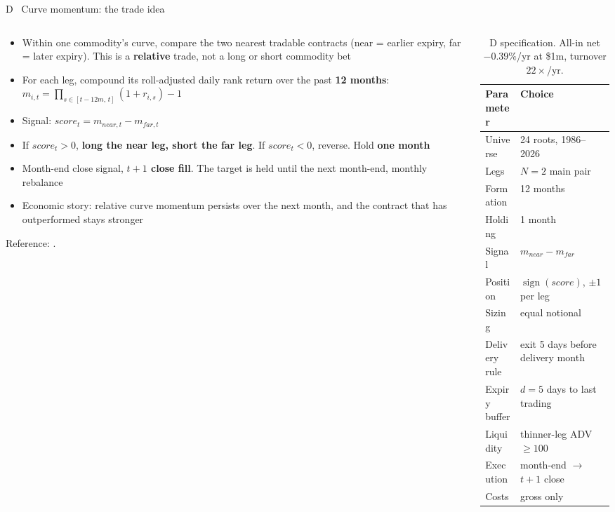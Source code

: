 \documentclass[10pt, aspectratio=169]{beamer}
\newcommand{\key}[1]{\textcolor{accent}{\textbf{#1}}}
\begin{document}
\begin{frame}{D \textperiodcentered\ Curve momentum: the trade idea}
\label{sl:d}
\begin{columns}[c, onlytextwidth]
\begin{column}{0.57\textwidth}
\footnotesize
\begin{itemize}
  \item Within one commodity's curve, compare the two nearest tradable
        contracts (near = earlier expiry, far = later expiry). This is a
        \key{relative} trade, not a long or short commodity bet
  \item For each leg, compound its roll-adjusted daily rank return over the
        past \key{12 months}:
        $m_{i,t}=\prod_{s\in[t-12m,\,t]}(1+r_{i,s})-1$
  \item Signal: \key{$score_t=m_{near,t}-m_{far,t}$}
  \item If $score_t>0$, \key{long the near leg, short the far leg}.
        If $score_t<0$, reverse. Hold \key{one month}
  \item Month-end close signal, \key{$t+1$ close fill}. The target is held
        until the next month-end, monthly rebalance
  \item Economic story: relative curve momentum persists over the next month,
        and the contract that has outperformed stays stronger
\end{itemize}
\vspace{0.2ex}
{\scriptsize\color{slate}Reference: \textcite{paschke2020curve}.}
\end{column}
\begin{column}{0.40\textwidth}
\begin{table}
\centering
\scriptsize
\setlength{\tabcolsep}{2pt}
\begin{tabular}{@{}L{2.35cm} L{3.15cm}@{}}
\toprule
Parameter & Choice \\
\midrule
Universe & 24 roots, 1986--2026 \\
Legs & $N=2$ main pair \\
Formation & 12 months \\
Holding & 1 month \\
Signal & $m_{near}-m_{far}$ \\
Position & $\operatorname{sign}(score)$, $\pm1$ per leg \\
Sizing & equal notional \\
Delivery rule & exit 5 days before delivery month \\
Expiry buffer & $d=5$ days to last trading \\
Liquidity & thinner-leg ADV $\ge100$ \\
Execution & month-end $\rightarrow$ $t+1$ close \\
Costs & gross only \\
\bottomrule
\end{tabular}
\caption{D specification. All-in net $-0.39\%$/yr at \$1m, turnover
$22\times$/yr.}
\end{table}
\end{column}
\end{columns}
\end{frame}
\end{document}

